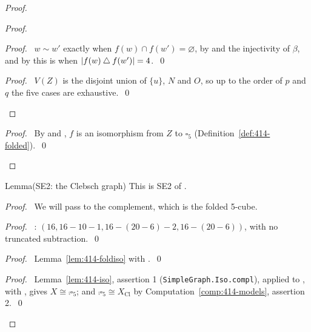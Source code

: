 \begin{proof}
\begin{proof}
  \begin{proof}\pf\ $w\sim w'$ exactly when $f(w)\cap f(w')=\varnothing$, by
    and the injectivity of $\beta$, and by  this is
   when $|f(w)\mathbin{\triangle} f(w')|=4$.~\qed\end{proof}
  \qedstep
  \begin{proof}\pf\ $V(Z)$ is the disjoint union of $\{u\}$, $N$ and $O$, so up to the order of
   $p$ and $q$ the five cases are exhaustive.~\qed\end{proof}
 \end{proof}
 \qedstep
 \begin{proof}\pf\ By  and , $f$ is an isomorphism from
  $Z$ to $\square_5$ (Definition~\ref{def:414-folded}).~\qed\end{proof}
\end{proof}

\begin{namedresult}{Lemma}{(SE2: the Clebsch graph)}\label{lem:414-SE2}
 This is SE2 of .
\end{namedresult}
\begin{proof}
 \pfsketch\ We will pass to the complement, which is the folded 5-cube.
 \begin{proof}\pf\ : $(16,16-10-1,16-(20-6)-2,16-(20-6))$, with no
  truncated subtraction.~\qed\end{proof}
 \begin{proof}\pf\ Lemma~\ref{lem:414-foldiso} with .~\qed\end{proof}
 \qedstep
 \begin{proof}\pf\ Lemma~\ref{lem:414-iso}, assertion 1 (\texttt{SimpleGraph.Iso.compl}), applied
  to , with , gives $X\cong\comp{\square_5}$; and
  $\comp{\square_5}\cong X_{\mathrm{Cl}}$ by Computation~\ref{comp:414-models},
  assertion 2.~\qed\end{proof}
\end{proof}

